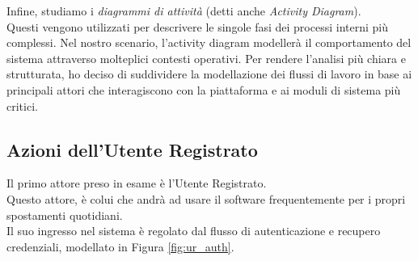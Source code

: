 Infine, studiamo i \textit{diagrammi di attività} (detti anche \textit{Activity Diagram}). \\
Questi vengono utilizzati per descrivere le singole fasi dei processi interni più complessi. Nel nostro scenario, l'activity diagram modellerà il comportamento del sistema attraverso molteplici contesti operativi. Per rendere l'analisi più chiara e strutturata, ho deciso di suddividere la modellazione dei flussi di lavoro in base ai principali attori che interagiscono con la piattaforma e ai moduli di sistema più critici.


\subsection*{Azioni dell'Utente Registrato}
Il primo attore preso in esame è l'Utente Registrato. \\ Questo attore, è colui che andrà ad usare il software frequentemente per i propri spostamenti quotidiani. \\
Il suo ingresso nel sistema è regolato dal flusso di autenticazione e recupero credenziali, modellato in Figura \ref{fig:ur_auth}.


